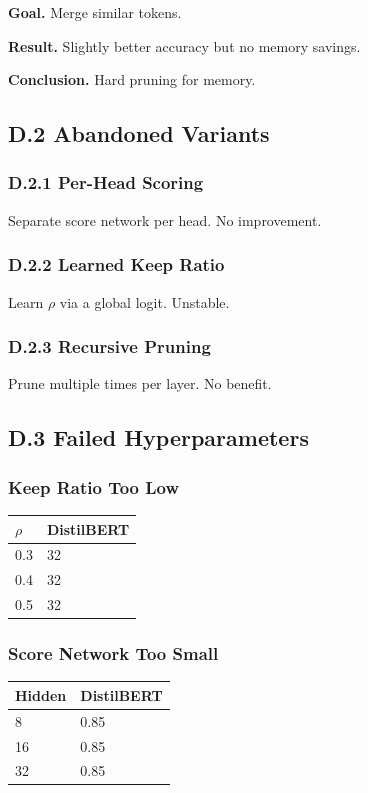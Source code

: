 \textbf{Goal.} Merge similar tokens.

\textbf{Result.} Slightly better accuracy but no memory savings.

\textbf{Conclusion.} Hard pruning for memory.

\subsection{D.2 Abandoned Variants}

\subsubsection{D.2.1 Per-Head Scoring}

Separate score network per head. No improvement.

\subsubsection{D.2.2 Learned Keep Ratio}

Learn $\rho$ via a global logit. Unstable.

\subsubsection{D.2.3 Recursive Pruning}

Prune multiple times per layer. No benefit.

\subsection{D.3 Failed Hyperparameters}

\subsubsection{Keep Ratio Too Low}
\begin{table}[H]
\centering
\small
\begin{tabular}{ll}
\toprule
\textbf{$\rho$} & \textbf{DistilBERT} \\
\midrule
0.3 & 32 \\
0.4 & 32 \\
0.5 & 32 \\
\bottomrule
\end{tabular}
\end{table}

\subsubsection{Score Network Too Small}
\begin{table}[H]
\centering
\small
\begin{tabular}{ll}
\toprule
\textbf{Hidden} & \textbf{DistilBERT} \\
\midrule
8 & 0.85 \\
16 & 0.85 \\
32 & 0.85 \\
\bottomrule
\end{tabular}
\end{table}

